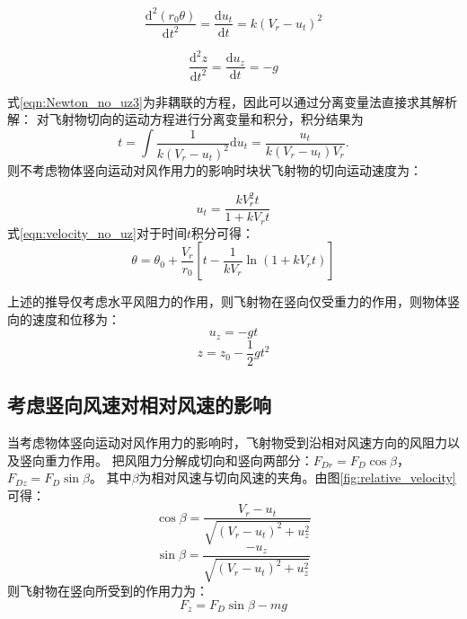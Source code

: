 \documentclass{ctexart}
\begin{document}
\begin{equation}
  \label{eqn:Newton_no_uz3}
      \frac{\mathrm{d}^2 \left(r_0 \theta\right)}{\mathrm{d} t^2} = \frac{\mathrm{d} u_t}{\mathrm{d} t} = k \left(V_r-u_t\right)^2
\end{equation}

\begin{equation}
\label{eqn:Newton_no_uz4}
\frac{\mathrm{d}^2 z}{\mathrm{d} t^2} = \frac{\mathrm{d} u_z}{\mathrm{d} t } = -g
\end{equation}
 

式\eqref{eqn:Newton_no_uz3}为非耦联的方程，因此可以通过分离变量法直接求其解析解：
对飞射物切向的运动方程进行分离变量和积分，积分结果为
\begin{equation}
t=\int \frac{1}{k \left(V_r-u_t\right)^2} \mathrm{d} u_t =\frac{u_t}{k\left(V_r-u_t\right) V_r}.
\end{equation}
则不考虑物体竖向运动对风作用力的影响时块状飞射物的切向运动速度为：

\begin{equation}
  \label{eqn:velocity_no_uz}
    u_t=\frac{kV_r^2 t}{1+k V_r t}
\end{equation}
式\eqref{eqn:velocity_no_uz}对于时间$t$积分可得：
\begin{equation}
  \label{eqn:displacement_no_uz}
    \theta=\theta_0+\frac{V_r}{r_0} \left[t-\frac{1}{k V_r} \ln \left(1+kV_r t\right)\right]
\end{equation}

上述的推导仅考虑水平风阻力的作用，则飞射物在竖向仅受重力的作用，则物体竖向的速度和位移为：
\begin{equation}
u_z=-gt
\end{equation}
\begin{equation}
z=z_0-\frac{1}{2}gt^2
\end{equation}
\subsection{考虑竖向风速对相对风速的影响}
当考虑物体竖向运动对风作用力的影响时，飞射物受到沿相对风速方向的风阻力以及竖向重力作用。
把风阻力分解成切向和竖向两部分：$F_{Dr} = F_D \cos \beta$， $F_{Dz} = F_D \sin \beta$。
其中$\beta$为相对风速与切向风速的夹角。由图\ref{fig:relative_velocity}可得：
\begin{equation}
\cos \beta=\frac{V_r-u_t}{\sqrt{(V_r-u_t)^2+u_z^2}}
\end{equation}
\begin{equation}
\sin \beta=\frac{-u_z}{\sqrt{(V_r-u_t)^2+u_z^2}}
\end{equation}
则飞射物在竖向所受到的作用力为：
\begin{equation}
F_z = F_D \sin \beta - mg
\end{equation}
\end{document}
